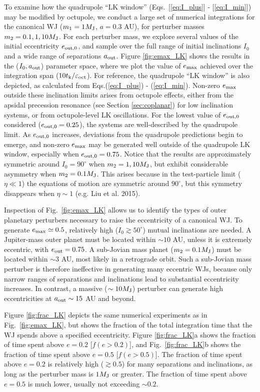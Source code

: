 \documentclass[12pt,useAMS, usenatbib]{mn2e}
\newcommand{\Max}{{\rm max}}
\newcommand{\Out}{{\rm out}}
\newcommand{\oct}{{\rm oct}}
\newcommand{\aout}{a_\Out}
\newcommand{\eout}{e_\Out}
\newcommand{\emax}{e_\Max}
\newcommand{\tk}{t_{\rm k}}
\newcommand{\mjup}{M_{\rm J}}
\begin{document}
To examine how the quadrupole ``LK window'' (Eqs.~[\ref{eq:I_plus}] - [\ref{eq:I_min}]) may be modified by octupole, we conduct a large set of numerical integrations for the canonical WJ ($m_1 = 1 \mjup$, $a = 0.3$ AU), for perturber masses $m_2 = 0.1, 1, 10 \mjup$.  For each perturber mass, we explore several values of the initial eccentricity $e_{\Out,0}$, and sample over the full range of initial inclinations $I_0$ and a wide range of separations $\aout$.  Figure \ref{fig:emax_LK} shows the results in the ($I_0,\aout$) parameter space, where we plot the value of $\emax$ achieved over the integration span ($10 \tk/\varepsilon_\oct$).  For reference, the quadrupole ``LK window'' is also depicted, as calculated from Eqs.(\ref{eq:I_plus}) - (\ref{eq:I_min}).  Non-zero $\emax$ outside these inclination limits arises from octupole effects, either from the apsidal precession resonance (see Section \ref{sec:coplanar}) for low inclination systems, or from octupole-level LK oscillations.  For the lowest value of $e_{\Out,0}$ considered ($e_{\Out,0} = 0.25$), the systems are well-described by the quadrupole limit.  As $e_{\Out,0}$ increases, deviations from the quadrupole predictions begin to emerge, and non-zero $\emax$ may be generated well outside of the quadrupole LK window, especially when $e_{\Out,0} = 0.75$.  Notice that the results are approximately symmetric around $I_0 = 90^\circ$ when $m_2 = 1, 10 \mjup$, but exhibit considerable asymmetry when $m_2 = 0.1 \mjup$.  This arises because in the test-particle limit ($\eta \ll 1$) the equations of motion are symmetric around $90^\circ$, but this symmetry disappears when $\eta \sim 1$ (e.g. Liu et al. 2015).

Inspection of Fig.~\ref{fig:emax_LK} allows us to identify the types of outer planetary perturbers necessary to raise the eccentricity of a canonical WJ.  To generate $\emax \simeq 0.5$, relatively high ($I_0 \gtrsim 50^\circ$) mutual inclinations are needed.  A Jupiter-mass outer planet must be located within $\sim 10$ AU, unless it is extremely eccentric, with $\eout = 0.75$.  A sub-Jovian mass planet ($m_2 = 0.1 \mjup$) must be located within $\sim 3$ AU, most likely in a retrograde orbit.  Such a sub-Jovian mass perturber is therefore ineffective in generating many eccentric WJs, because only narrow ranges of separations and inclinations lead to substantial eccentricity increases.  In contrast, a massive ($\sim  10 \mjup$) perturber can generate high eccentricities at $\aout \sim 15$ AU and beyond.

Figure \ref{fig:frac_LK} depicts the same numerical experiments as in Fig.~\ref{fig:emax_LK}, but shows the fraction of the total integration time that the WJ spends above a specified eccentricity.  Figure \ref{fig:frac_LK}a shows the fraction of time spent above $e = 0.2$ [$f(e > 0.2)$], and Fig.~\ref{fig:frac_LK}b shows the fraction of time spent above $e = 0.5$ [$f(e > 0.5)$].  The fraction of time spent above $e = 0.2$ is relatively high ($\gtrsim 0.5$) for many separations and inclinations, as long as the perturber mass is $1 \mjup$ or greater.  The fraction of time spent above $e = 0.5$ is much lower, usually not exceeding $\sim 0.2$.  
\end{document}
